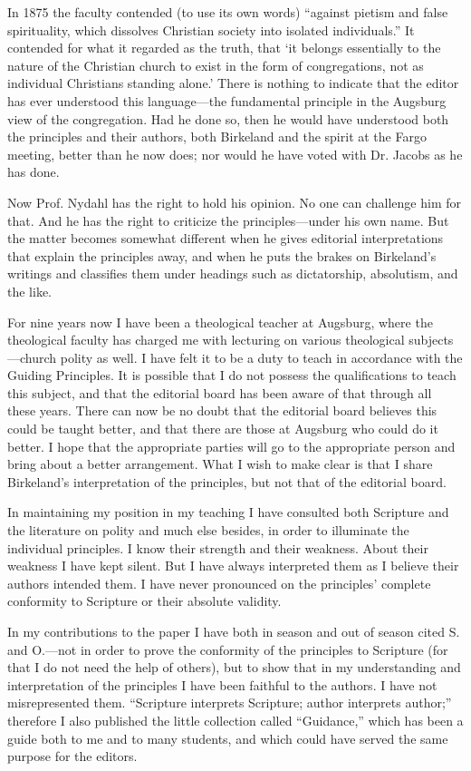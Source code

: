 In 1875 the faculty contended (to use its own words) “against pietism and false spirituality, which dissolves Christian society into isolated individuals.” It contended for what it regarded as the truth, that ‘it belongs essentially to the nature of the Christian church to exist in the form of congregations, not as individual Christians standing alone.’ There is nothing to indicate that the editor has ever understood this language—the fundamental principle in the Augsburg view of the congregation. Had he done so, then he would have understood both the principles and their authors, both Birkeland and the spirit at the Fargo meeting, better than he now does; nor would he have voted with Dr. Jacobs as he has done.

Now Prof. Nydahl has the right to hold his opinion. No one can challenge him for that. And he has the right to criticize the principles—under his own name. But the matter becomes somewhat different when he gives editorial interpretations that explain the principles away, and when he puts the brakes on Birkeland’s writings and classifies them under headings such as dictatorship, absolutism, and the like.

For nine years now I have been a theological teacher at Augsburg, where the theological faculty has charged me with lecturing on various theological subjects—church polity as well. I have felt it to be a duty to teach in accordance with the Guiding Principles. It is possible that I do not possess the qualifications to teach this subject, and that the editorial board has been aware of that through all these years. There can now be no doubt that the editorial board believes this could be taught better, and that there are those at Augsburg who could do it better. I hope that the appropriate parties will go to the appropriate person and bring about a better arrangement. What I wish to make clear is that I share Birkeland’s interpretation of the principles, but not that of the editorial board.

In maintaining my position in my teaching I have consulted both Scripture and the literature on polity and much else besides, in order to illuminate the individual principles. I know their strength and their weakness. About their weakness I have kept silent. But I have always interpreted them as I believe their authors intended them. I have never pronounced on the principles’ complete conformity to Scripture or their absolute validity.

In my contributions to the paper I have both in season and out of season cited S. and O.—not in order to prove the conformity of the principles to Scripture (for that I do not need the help of others), but to show that in my understanding and interpretation of the principles I have been faithful to the authors. I have not misrepresented them. “Scripture interprets Scripture; author interprets author;” therefore I also published the little collection called “Guidance,” which has been a guide both to me and to many students, and which could have served the same purpose for the editors.

